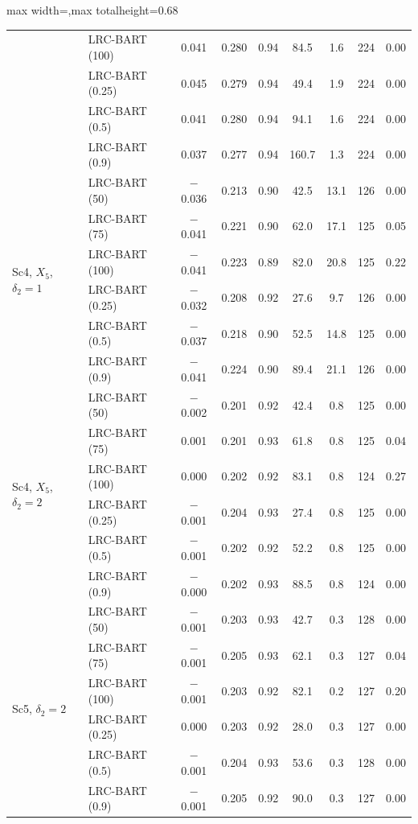 \begin{table}[htbp]
\begin{adjustbox}{max width=\textwidth,max totalheight=0.68\textheight}
\begin{tabular}{llccccccc}
& LRC-BART (100) & 0.041 & 0.280 & 0.94 & 84.5 & 1.6 & 224 & 0.00 \\
& LRC-BART (0.25) & 0.045 & 0.279 & 0.94 & 49.4 & 1.9 & 224 & 0.00 \\
& LRC-BART (0.5) & 0.041 & 0.280 & 0.94 & 94.1 & 1.6 & 224 & 0.00 \\
& LRC-BART (0.9) & 0.037 & 0.277 & 0.94 & 160.7 & 1.3 & 224 & 0.00 \\
\midrule
\multirow{6}{*}{Sc4, $X_5$, $\delta_2=1$} & LRC-BART (50) & $-$0.036 & 0.213 & 0.90 & 42.5 & 13.1 & 126 & 0.00 \\
& LRC-BART (75) & $-$0.041 & 0.221 & 0.90 & 62.0 & 17.1 & 125 & 0.05 \\
& LRC-BART (100) & $-$0.041 & 0.223 & 0.89 & 82.0 & 20.8 & 125 & 0.22 \\
& LRC-BART (0.25) & $-$0.032 & 0.208 & 0.92 & 27.6 & 9.7 & 126 & 0.00 \\
& LRC-BART (0.5) & $-$0.037 & 0.218 & 0.90 & 52.5 & 14.8 & 125 & 0.00 \\
& LRC-BART (0.9) & $-$0.041 & 0.224 & 0.90 & 89.4 & 21.1 & 126 & 0.00 \\
\midrule
\multirow{6}{*}{Sc4, $X_5$, $\delta_2=2$} & LRC-BART (50) & $-$0.002 & 0.201 & 0.92 & 42.4 & 0.8 & 125 & 0.00 \\
& LRC-BART (75) & 0.001 & 0.201 & 0.93 & 61.8 & 0.8 & 125 & 0.04 \\
& LRC-BART (100) & 0.000 & 0.202 & 0.92 & 83.1 & 0.8 & 124 & 0.27 \\
& LRC-BART (0.25) & $-$0.001 & 0.204 & 0.93 & 27.4 & 0.8 & 125 & 0.00 \\
& LRC-BART (0.5) & $-$0.001 & 0.202 & 0.92 & 52.2 & 0.8 & 125 & 0.00 \\
& LRC-BART (0.9) & $-$0.000 & 0.202 & 0.93 & 88.5 & 0.8 & 124 & 0.00 \\
\midrule
\multirow{6}{*}{Sc5, $\delta_2=2$} & LRC-BART (50) & $-$0.001 & 0.203 & 0.93 & 42.7 & 0.3 & 128 & 0.00 \\
& LRC-BART (75) & $-$0.001 & 0.205 & 0.93 & 62.1 & 0.3 & 127 & 0.04 \\
& LRC-BART (100) & $-$0.001 & 0.203 & 0.92 & 82.1 & 0.2 & 127 & 0.20 \\
& LRC-BART (0.25) & 0.000 & 0.203 & 0.92 & 28.0 & 0.3 & 127 & 0.00 \\
& LRC-BART (0.5) & $-$0.001 & 0.204 & 0.93 & 53.6 & 0.3 & 128 & 0.00 \\
& LRC-BART (0.9) & $-$0.001 & 0.205 & 0.92 & 90.0 & 0.3 & 127 & 0.00 \\
\bottomrule
\end{tabular}
\end{adjustbox}
\end{table}
